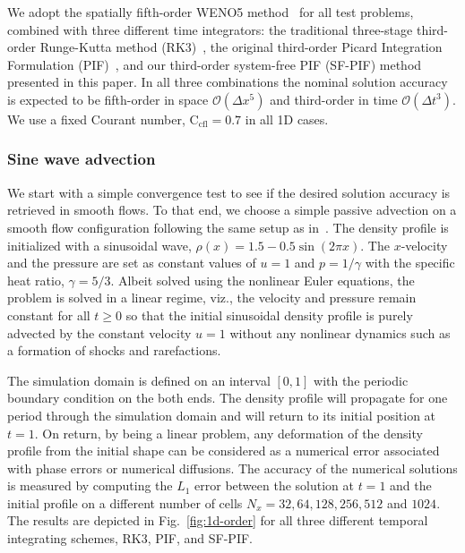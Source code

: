 \documentclass[times,preprint,3p]{elsarticle}
\newcommand{\dt}{\Delta t}
\newcommand{\dx}{\Delta x}
\begin{document}
We adopt the spatially fifth-order WENO5 method~\cite{jiang1996efficient} for all test problems,
combined with three
different time integrators: the traditional three-stage
third-order Runge-Kutta method (RK3)~\cite{gottlieb1998total},
the original third-order Picard Integration Formulation (PIF)~\cite{christlieb2015picard}, and
our third-order system-free PIF (SF-PIF) method presented in this paper.
In all three combinations the nominal solution accuracy is expected to be
fifth-order in space \( \mathcal{O} (\dx^{5}) \)
and third-order in time \( \mathcal{O} (\dt^{3}) \).
We use a fixed Courant number, \( \text{C}_{\text{cfl}} = 0.7 \) in all 1D cases.

\subsubsection{Sine wave advection}\label{sec:1Dsine_advection}

We start with a simple convergence test to see if the desired solution accuracy
is retrieved in smooth flows.
To that end, we choose a simple passive advection
on a smooth flow configuration
following the same setup as in~\cite{lee2017piecewise}.
%
The density profile is initialized with a sinusoidal wave,
\( \rho (x) = 1.5 - 0.5\sin(2\pi x)\).
The $x$-velocity and
the pressure are set as constant values of \( u = 1\) and
\( p = 1/\gamma \)
with the specific heat ratio, \( \gamma = 5/3 \).
Albeit solved using the nonlinear Euler equations, the problem is
solved in a linear regime, viz., the velocity and pressure remain
constant for all $t\ge 0$ so that the initial sinusoidal density profile
is purely advected by the constant velocity $u=1$ without any nonlinear
dynamics such as a formation of shocks and rarefactions.
%


The simulation domain is defined on an interval \( [0, 1] \)
with the periodic boundary condition on the both ends.
The density profile will propagate for one period through
the simulation domain and will return to its initial position
at \( t = 1 \).
%
%
%
%
%
On return, by being a linear problem,
any deformation of the density profile from the initial shape
can be considered as a numerical error
associated with phase errors or numerical diffusions.
The accuracy of the numerical solutions is measured
by computing the \( L_{1} \)
error between the solution at \( t = 1 \)
and the initial profile
%
on a different number of cells
\( N_{x} = 32, 64, 128, 256, 512\) and \( 1024 \).
The results are
depicted in Fig.~\ref{fig:1d-order} for
all three different temporal integrating schemes, RK3, PIF, and SF-PIF\@.
\end{document}
